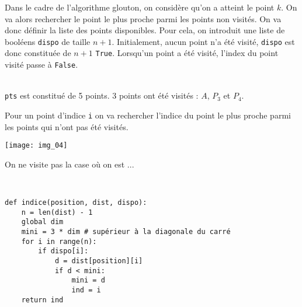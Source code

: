 Dans le cadre de l'algorithme glouton, on considère qu'on a atteint le point $k$. On va alors rechercher le point le plus proche parmi les points non visités. On va donc définir la liste des points disponibles. Pour cela, on introduit une liste de booléens \texttt{dispo} de taille $n+1$. Initialement, aucun point n'a été visité, \texttt{dispo} est donc constituée de $n+1$ \texttt{True}. Lorsqu'un point a été visité, l'index du point visité passe à \texttt{False}. 
\fi


\ifprof
\begin{corrige}~\\
\texttt{pts} est constitué de 5 points. 
3 points ont été visités : $A$, $P_3$ et $P_4$. 
\end{corrige}
\else
\fi

\ifprof
\else

Pour un point d'indice \texttt{i} on va rechercher l'indice du point le plus proche parmi les points qui n'ont pas été visités.

\begin{center}
\texttt{[image: img\_04]}
\end{center}
\fi


\ifprof
\begin{corrige} 
On ne visite pas la case où on est ...
\end{corrige}
\else
\fi

\ifprof
\begin{corrige}~\\ \vspace{-.5cm}
\begin{lstlisting}
def indice(position, dist, dispo):
    n = len(dist) - 1
    global dim
    mini = 3 * dim # supérieur à la diagonale du carré
    for i in range(n):
        if dispo[i]:
            d = dist[position][i]
            if d < mini:
                mini = d
                ind = i
    return ind
\end{lstlisting}
\end{corrige}
\else
\fi

